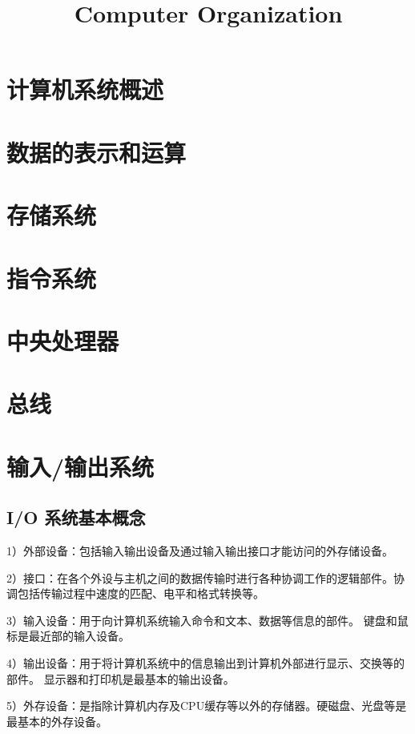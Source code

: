 \documentclass{ctexart}
\title{Computer Organization}
\author{}
\date{}
\begin{document}
\maketitle

\newpage

\tableofcontents

\section{计算机系统概述}

\section{数据的表示和运算}

\section{存储系统}

\section{指令系统}

\section{中央处理器}

\section{总线}

\section{输入/输出系统}
\subsection{ I/O 系统基本概念}
1）外部设备：包括输入输出设备及通过输入输出接口才能访问的外存储设备。

2）接口：在各个外设与主机之间的数据传输时进行各种协调工作的逻辑部件。协调包括传输过程中速度的匹配、电平和格式转换等。

3）输入设备：用于向计算机系统输入命令和文本、数据等信息的部件。
键盘和鼠标是最近部的输入设备。

4）输出设备：用于将计算机系统中的信息输出到计算机外部进行显示、交换等的部件。
显示器和打印机是最基本的输出设备。

5）外存设备：是指除计算机内存及CPU缓存等以外的存储器。硬磁盘、光盘等是最基本的外存设备。
\end{document}
